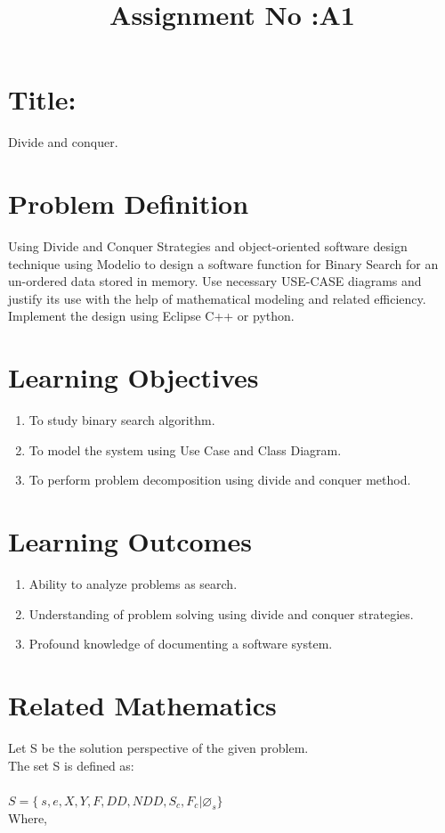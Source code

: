 \documentclass[10pt,a4paper]{article}
\title{Assignment No :A1}
\date{}
\begin{document}
\maketitle
\section{Title:}
Divide and conquer.

\section{Problem Definition}
Using Divide and Conquer Strategies and object-oriented software design
technique using Modelio to design a software function for Binary Search for an
un-ordered data stored in memory. Use necessary USE-CASE diagrams and
justify its use with the help of mathematical modeling and related efficiency.
Implement the design using Eclipse C++ or python.

\section{Learning Objectives}
\begin{enumerate}
\item To study binary search algorithm.
\item To model the system using Use Case and Class Diagram.
\item To perform problem decomposition using divide and conquer method.
\end{enumerate}

\section{Learning Outcomes}
\begin{enumerate}
\item Ability to analyze problems as search.
\item Understanding of problem solving using divide and conquer strategies.
\item Profound knowledge of documenting a software system.
\end{enumerate}


\section{Related Mathematics}
Let S be the solution perspective of the given problem.\\
The set S is defined as:\\\\
$S=\lbrace\ s,e,X,Y,F,DD,NDD,S_{c},F_{c}|\varnothing_{s}\rbrace$ \\
Where,
\end{document}
